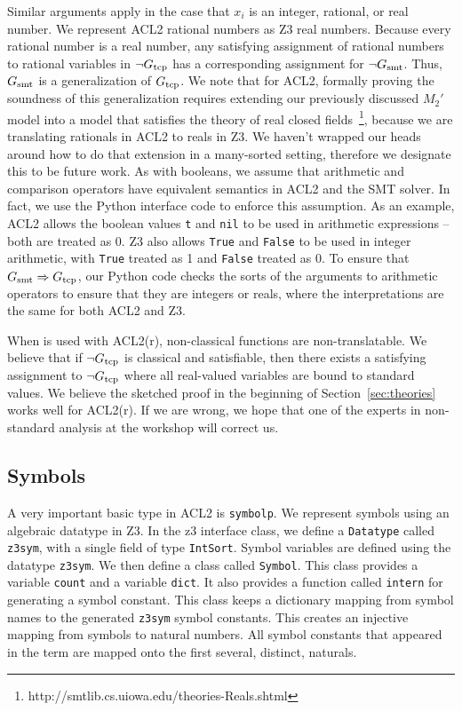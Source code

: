 Similar arguments apply in the case that $x_i$ is an integer, rational, or real
number. We represent ACL2 rational numbers as Z3 real numbers. Because every
rational number is a real number, any satisfying assignment of rational numbers
to rational variables in $\neg G_{\mathrm{tcp}}$ has a corresponding assignment for $\neg
G_{\mathrm{smt}}$. Thus, $G_{\mathrm{smt}}$ is a generalization of $G_{\mathrm{tcp}}$.
We note that for ACL2, formally proving the soundness of this generalization
requires extending our previously discussed $M_2'$ model into a model that
satisfies the theory of real closed
fields~\footnote{http://smtlib.cs.uiowa.edu/theories-Reals.shtml}, because we
are translating rationals in ACL2 to reals in Z3. We haven't wrapped our heads
around how to do that extension in a many-sorted setting, therefore we designate
this to be future work. As with booleans, we assume that arithmetic and
comparison operators have equivalent semantics in ACL2 and the 
SMT solver. In fact, we use the Python interface code to enforce this
assumption. As an example, ACL2 allows the boolean values \texttt{t} and
\texttt{nil} to be used in arithmetic expressions -- both are treated as 0.
Z3 also allows \texttt{True} and \texttt{False} to be used in integer
arithmetic, with \texttt{True} treated as 1 and \texttt{False} treated as 0.
To ensure that $G_{\mathrm{smt}} \Rightarrow G_{\mathrm{tcp}}$, our Python code checks the sorts of the
arguments to arithmetic operators to ensure that they are integers or reals, where
the interpretations are the same for both ACL2 and Z3.

When \smtlink{} is used with ACL2(r), non-classical functions are non-translatable.
We believe that if $\neg G_{\mathrm{tcp}}$ is classical and satisfiable,
then there exists a satisfying assignment to $\neg G_{\mathrm{tcp}}$ where all real-valued
variables are bound to standard values. We believe the sketched proof in the
beginning of Section~\ref{sec:theories} works well for ACL2(r). If we are wrong,
we hope that one of the experts in non-standard analysis at the workshop will
correct us.

\subsection{Symbols}
A very important basic type in ACL2 is \texttt{symbolp}. We represent symbols
using an algebraic datatype in Z3. In the z3 interface class, we define a
\texttt{Datatype} called \texttt{z3sym}, with a single field of type
\texttt{IntSort}. Symbol variables are defined using the datatype
\texttt{z3sym}. We then define a class called \texttt{Symbol}. This class
provides a variable \texttt{count} and a variable \texttt{dict}. It also
provides a function called \texttt{intern} for generating a symbol constant.
This class keeps a dictionary mapping from symbol names to the generated
\texttt{z3sym} symbol constants. This creates an injective mapping from symbols
to natural numbers. 
All symbol constants that appeared in the term are mapped onto the first
several, distinct, naturals.

